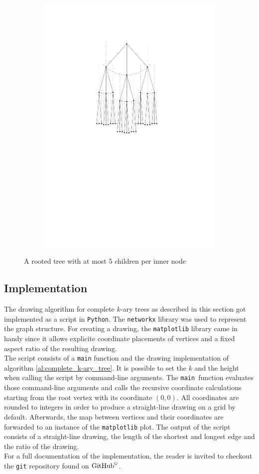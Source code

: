 \begin{figure}[H]
	\centering
	\begin{subfigure}{0.5\textwidth}
		\centering
		\includegraphics[page=3,width=0.6\linewidth]{graphics/k-ary_tree_example_drawings.pdf}
	\end{subfigure}
	\caption{A rooted tree with at most 5 children per inner node}\label{im:general-tree}
\end{figure}

\subsection{Implementation}

The drawing algorithm for complete $k$-ary trees as described in this section got implemented as a script in \texttt{Python}. The \texttt{networkx} library was used to represent the graph structure. For creating a drawing, the \texttt{matplotlib} library came in handy since it allows explicite coordinate placements of vertices and a fixed aspect ratio of the resulting drawing.\\
The script consists of a \texttt{main} function and the drawing implementation of algorithm \ref{al:complete_k-ary_tree}. It is possible to set the $k$ and the height when calling the script by command-line arguments. The \texttt{main }function evaluates those command-line arguments and calls the recursive coordinate calculations starting from the root vertex with its coordinate $(0,0)$. All coordinates are rounded to integers in order to produce a straight-line drawing on a grid by default. Afterwards, the map between vertices and their coordinates are forwarded to an instance of the \texttt{matplotlib} plot. The output of the script consists of a straight-line drawing, the length of the shortest and longest edge and the ratio of the drawing.
\bigskip\\
For a full documentation of the implementation, the reader is invited to checkout the \texttt{git} repository found on $\text{GitHub}^{\copyright}$\cite{repository}.

